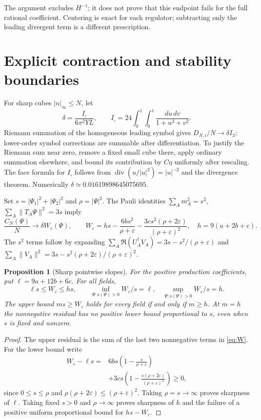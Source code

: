 \documentclass[11pt]{article}
\newtheorem{proposition}[theorem]{Proposition}
\newcommand{\eps}{\varepsilon}
\begin{document}
The argument excludes $H^{-1}$; it does not prove that this endpoint fails
for the full rational coefficient. Centering is exact for each regulator;
subtracting only the leading divergent term is a different prescription.

\section{Explicit contraction and stability boundaries}
For sharp cubes $|n|_\infty\le N$, let
\begin{equation}\label{eq:delta}
 \delta=\frac{I_\square}{6\pi^2YL},\qquad
 I_\square=24\int_0^1\!\int_0^1\frac{du\,dv}{1+u^2+v^2}.
\end{equation}
Riemann summation of the homogeneous leading symbol gives
$D_{N,i}/N\to\delta I_3$; lower-order symbol corrections are summable
after differentiation. To justify the Riemann sum near zero, remove a
fixed small cube there, apply ordinary summation elsewhere, and bound
its contribution by $C\eta$ uniformly after rescaling.
The face formula for $I_\square$ follows from
$\operatorname{div}(u/|u|^2)=|u|^{-2}$ and the divergence theorem.
Numerically $\delta\simeq0.01619898645075695$.

Set $s=|\Psi_1|^2+|\Psi_2|^2$ and $\rho=|\Psi|^2$.
The Pauli identities $\sum_A m_A^2=s^2$,
$\sum_A\|T_A\Psi\|^2=3s$ imply
\begin{equation}\label{eq:W}
 \frac{C_N(\Psi)}{N}\longrightarrow\delta W_\eps(\Psi),\qquad
 W_\eps=hs-\frac{6bs^2}{\rho+\eps}
             -\frac{3cs^2(\rho+2\eps)}{(\rho+\eps)^2},
 \quad h=9(a+2b+c).
\end{equation}
The $s^2$ terms follow by expanding
$\sum_A\Re(U_A^\dagger V_A)=3s-s^2/(\rho+\eps)$ and
$\sum_A\|V_A\|^2=3s-s^2(\rho+2\eps)/(\rho+\eps)^2$.

\begin{proposition}[Sharp pointwise slopes]\label{prop:slopes}
For the positive production coefficients, put $\ell=9a+12b+6c$.
For all fields,
\begin{equation}\label{eq:slopes}
 \ell s\le W_\eps\le hs,\qquad
 \inf_{\Psi:s(\Psi)>0}W_\eps/s=\ell,\quad
 \sup_{\Psi:s(\Psi)>0}W_\eps/s=h.
\end{equation}
The upper bound $ms\ge W_\eps$ holds for every field if and only if $m\ge h$.
At $m=h$ the nonnegative residual has no positive lower bound proportional
to $s$, even when $s$ is fixed and nonzero.
\end{proposition}
\begin{proof}
The upper residual is the sum of the last two nonnegative terms in
\eqref{eq:W}. For the lower bound write
\begin{align*}
 W_\eps-\ell s={}&6bs\left(1-\frac{s}{\rho+\eps}\right)\\
 &+3cs\left(1-\frac{s(\rho+2\eps)}{(\rho+\eps)^2}\right)\ge0,
\end{align*}
since $0\le s\le\rho$ and $\rho(\rho+2\eps)\le(\rho+\eps)^2$.
Taking $\rho=s\to\infty$ proves sharpness of $\ell$.
Taking fixed $s>0$ and $\rho\to\infty$ proves sharpness of $h$ and the
failure of a positive uniform proportional bound for $hs-W_\eps$.
\end{proof}
\end{document}
